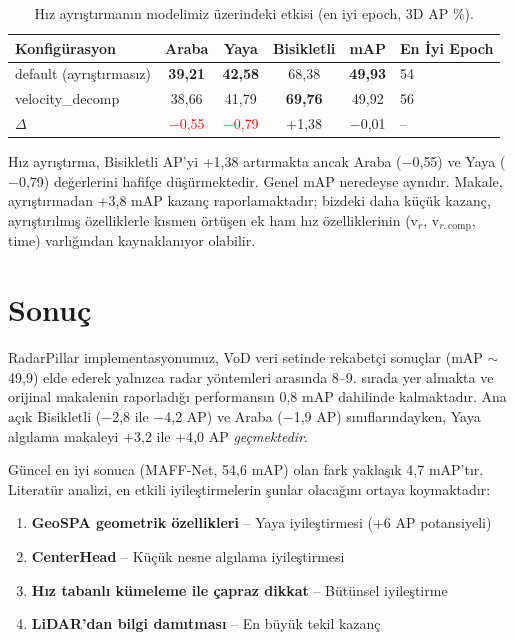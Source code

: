 \documentclass[a4paper,11pt]{article}
\newcommand{\gain}[1]{\textcolor{bestcolor}{+#1}}
\newcommand{\loss}[1]{\textcolor{red}{#1}}
\begin{document}
\begin{table}[H]
\centering
\caption{Hız ayrıştırmanın modelimiz üzerindeki etkisi (en iyi epoch, 3D AP \%).}
\label{tab:veldecomp}
\small
\renewcommand{\arraystretch}{1.15}
\begin{tabular}{@{}lccccl@{}}
\toprule
\textbf{Konfigürasyon} & \textbf{Araba} & \textbf{Yaya} & \textbf{Bisikletli} & \textbf{mAP} & \textbf{En İyi Epoch} \\
\midrule
default (ayrıştırmasız)  & \textbf{39{,}21} & \textbf{42{,}58} & 68{,}38          & \textbf{49{,}93} & 54 \\
velocity\_decomp         & 38{,}66          & 41{,}79          & \textbf{69{,}76} & 49{,}92          & 56 \\
\midrule
$\Delta$                 & \loss{$-$0{,}55} & \loss{$-$0{,}79} & \gain{1{,}38}    & $-$0{,}01        & -- \\
\bottomrule
\end{tabular}
\end{table}

\noindent
Hız ayrıştırma, Bisikletli AP'yi +1{,}38 artırmakta ancak Araba ($-$0{,}55) ve Yaya ($-$0{,}79) değerlerini hafifçe düşürmektedir. Genel mAP neredeyse aynıdır. Makale, ayrıştırmadan +3{,}8 mAP kazanç raporlamaktadır; bizdeki daha küçük kazanç, ayrıştırılmış özelliklerle kısmen örtüşen ek ham hız özelliklerinin (v$_r$, v$_{r,\text{comp}}$, time) varlığından kaynaklanıyor olabilir.

\section{Sonuç}

RadarPillar implementasyonumuz, VoD veri setinde rekabetçi sonuçlar (mAP ${\sim}$49{,}9) elde ederek yalnızca radar yöntemleri arasında 8--9. sırada yer almakta ve orijinal makalenin raporladığı performansın 0{,}8 mAP dahilinde kalmaktadır. Ana açık Bisikletli ($-$2{,}8 ile $-$4{,}2 AP) ve Araba ($-$1{,}9 AP) sınıflarındayken, Yaya algılama makaleyi +3{,}2 ile +4{,}0 AP \textit{geçmektedir}.

Güncel en iyi sonuca (MAFF-Net, 54{,}6 mAP) olan fark yaklaşık 4{,}7 mAP'tır. Literatür analizi, en etkili iyileştirmelerin şunlar olacağını ortaya koymaktadır:
\begin{enumerate}[nosep]
    \item \textbf{GeoSPA geometrik özellikleri} -- Yaya iyileştirmesi (+6 AP potansiyeli)
    \item \textbf{CenterHead} -- Küçük nesne algılama iyileştirmesi
    \item \textbf{Hız tabanlı kümeleme ile çapraz dikkat} -- Bütünsel iyileştirme
    \item \textbf{LiDAR'dan bilgi damıtması} -- En büyük tekil kazanç
\end{enumerate}
\end{document}
